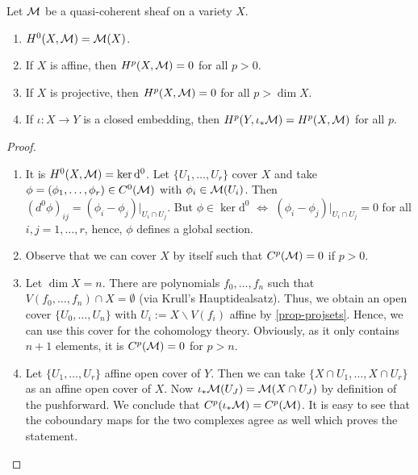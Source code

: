\documentclass[a4paper,11pt]{article}
\begin{document}
			\begin{prop}\label{prop--cohomology}
				Let $\mathcal{M}$ be a quasi-coherent sheaf on a variety $X$.
				\begin{enumerate}
					\item $H^0(X,\mathcal{M})=\mathcal{M}(X)$.
					\item If $X$ is affine, then $H^p(X,\mathcal{M})=0$ for all $p>0$.
					\item If $X$ is projective, then $H^p(X,\mathcal{M})=0$ for all $p>\dim X$.
					\item If $\iota:X\rightarrow Y$ is a closed embedding, then $H^p(Y,\iota_\ast\mathcal{M})=H^p(X,\mathcal{M})$ for all $p$.
				\end{enumerate}
			\end{prop}
			\begin{proof}
				\begin{enumerate}
					\item It is $H^0(X,\mathcal{M})=\ker\mathrm{d}^0$. Let $\{U_1,\dots,U_r\}$ cover $X$ and take $\phi=(\phi_1,\dots,\phi_r)\in C^0(\mathcal{M})$ with $\phi_i\in\mathcal{M}(U_i)$. Then $(d^0\phi)_{ij}=(\phi_i-\phi_j)|_{U_i\cap U_j}$. But $\phi\in\ker\mathrm{d}^0$ $\Longleftrightarrow$ $(\phi_i-\phi_j)|_{U_i\cap U_j}=0$ for all $i,j=1,\dots,r$, hence, $\phi$ defines a global section.
					\item Observe that we can cover $X$ by itself such that $C^p(\mathcal{M})=0$ if $p>0$.
					\item Let $\dim X=n$. There are polynomials $f_0,\dots,f_n$ such that $V(f_0,\dots,f_n)\cap X=\emptyset$ (via Krull's Hauptidealsatz). Thus, we obtain an open cover $\{U_0,\dots,U_n\}$ with $U_i:=X\backslash V(f_i)$ affine by \autoref{prop-projsets}. Hence, we can use this cover for the cohomology theory. Obviously, as it only contains $n+1$ elements, it is $C^p(\mathcal{M})=0$ for $p>n$.
					\item Let $\{U_1,\dots,U_r\}$ affine open cover of $Y$. Then we can take $\{X\cap U_1,\dots,X\cap U_r\}$ as an affine open cover of $X$. Now $\iota_\ast\mathcal{M}(U_J)=\mathcal{M}(X\cap U_J)$ by definition of the pushforward. We conclude that $C^p(\iota_\ast\mathcal{M})=C^p(\mathcal{M})$. It is easy to see that the coboundary maps for the two complexes agree as well which proves the statement. 
				\end{enumerate}
			\end{proof}
\end{document}
